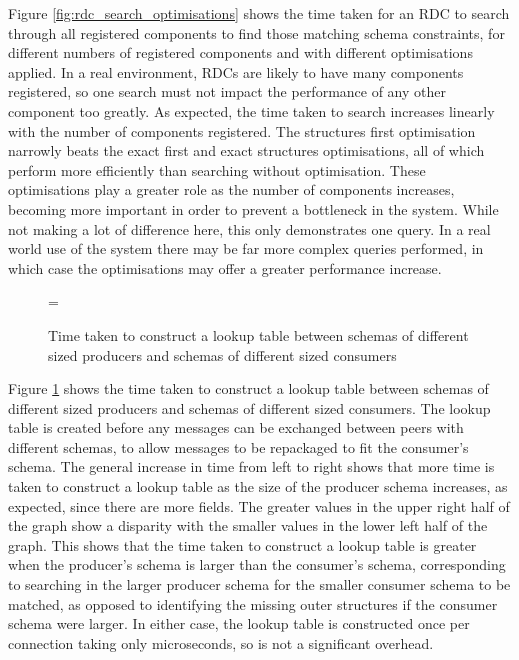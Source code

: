 \documentclass[12pt,twoside,notitlepage]{report}
\begin{document}
Figure \ref{fig:rdc_search_optimisations} shows the time taken for an RDC to search through all registered components to find those matching schema constraints, for different numbers of registered components and with different optimisations applied. 
In a real environment, RDCs are likely to have many components registered, so one search must not impact the performance of any other component too greatly.
As expected, the time taken to search increases linearly with the number of components registered. 
The structures first optimisation narrowly beats the exact first and exact structures optimisations, all of which perform more efficiently than searching without optimisation. 
These optimisations play a greater role as the number of components increases, becoming more important in order to prevent a bottleneck in the system. 
While not making a lot of difference here, this only demonstrates one query. 
In a real world use of the system there may be far more complex queries performed, in which case the optimisations may offer a greater performance increase.  

\begin{figure}
\epsfxsize=\hsize
\centerline{}
\caption[Construct Lookup Times]{Time taken to construct a lookup table between schemas of different sized producers and schemas of different sized consumers}
\label{fig:construct_lookup}
\end{figure}

Figure \ref{fig:construct_lookup} shows the time taken to construct a lookup table between schemas of different sized producers and schemas of different sized consumers. 
The lookup table is created before any messages can be exchanged between peers with different schemas, to allow messages to be repackaged to fit the consumer's schema. 
The general increase in time from left to right shows that more time is taken to construct a lookup table as the size of the producer schema increases, as expected, since there are more fields. 
The greater values in the upper right half of the graph show a disparity with the smaller values in the lower left half of the graph. 
This shows that the time taken to construct a lookup table is greater when the producer's schema is larger than the consumer's schema, corresponding to searching in the larger producer schema for the smaller consumer schema to be matched, as opposed to identifying the missing outer structures if the consumer schema were larger.
In either case, the lookup table is constructed once per connection taking only microseconds, so is not a significant overhead. 
\end{document}
